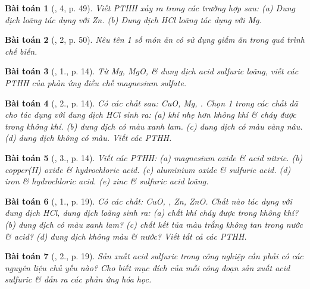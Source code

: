 \documentclass{article}
\newtheorem{baitoan}{Bài toán}
\begin{document}
\begin{baitoan}[\cite{SGK_KHTN_8_Canh_Dieu}, 4, p. 49]
	Viết PTHH xảy ra trong các trường hợp sau: (a) Dung dịch \emph{} loãng tác dụng với \emph{Zn}. (b) Dung dịch \emph{HCl} loãng tác dụng với \emph{Mg}.
\end{baitoan}

\begin{baitoan}[\cite{SGK_KHTN_8_Canh_Dieu}, 2, p. 50]
	Nêu tên 1 số món ăn có sử dụng giấm ăn trong quá trình chế biến.
\end{baitoan}

\begin{baitoan}[\cite{SGK_Hoa_Hoc_9}, 1., p. 14]
	Từ \emph{Mg, MgO, } \& dung dịch acid sulfuric loãng, viết các PTHH của phản ứng điều chế magnesium sulfate.
\end{baitoan}

\begin{baitoan}[\cite{SGK_Hoa_Hoc_9}, 2., p. 14]
	Có các chất sau: \emph{CuO, Mg, }. Chọn 1 trong các chất đã cho tác dụng với dung dịch \emph{HCl} sinh ra: (a) khí nhẹ hơn không khí \& cháy được trong không khí. (b) dung dịch có màu xanh lam. (c) dung dịch có màu vàng nâu. (d) dung dịch không có màu. Viết các PTHH.
\end{baitoan}

\begin{baitoan}[\cite{SGK_Hoa_Hoc_9}, 3., p. 14]
	Viết các PTHH: (a) magnesium oxide \& acid nitric. (b) copper(II) oxide \& hydrochloric acid. (c) aluminium oxide \& sulfuric acid. (d) iron \& hydrochloric acid. (e) zinc \& sulfuric acid loãng.
\end{baitoan}

\begin{baitoan}[\cite{SGK_Hoa_Hoc_9}, 1., p. 19]
	Có các chất: \emph{CuO, , Zn, ZnO}. Chất nào tác dụng với dung dịch \emph{HCl}, dung dịch \emph{} loãng sinh ra: (a) chất khí cháy được trong không khí? (b) dung dịch có màu xanh lam? (c) chất kết tủa màu trắng không tan trong nước \& acid? (d) dung dịch không màu \& nước? Viết tất cả các PTHH.
\end{baitoan}

\begin{baitoan}[\cite{SGK_Hoa_Hoc_9}, 2., p. 19]
	Sản xuất acid sulfuric trong công nghiệp cần phải có các nguyên liệu chủ yếu nào? Cho biết mục đích của mỗi công đoạn sản xuất acid sulfuric \& dẫn ra các phản ứng hóa học.
\end{baitoan}
\end{document}

